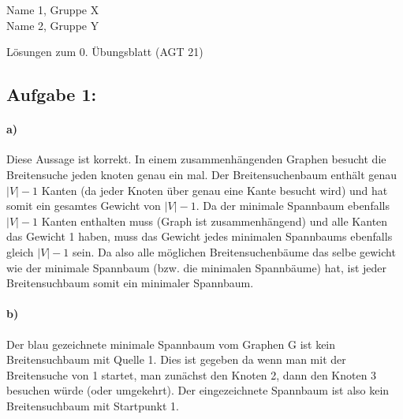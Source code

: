 \documentclass[a4paper]{article}
\begin{document}
\begin{small}
	\noindent
	Name 1, Gruppe X\\
	Name 2, Gruppe Y
\end{small}
\bigskip

\begin{center}
	\LARGE Lösungen zum 0. Übungsblatt (AGT 21)
\end{center}
\smallskip

\subsection*{Aufgabe 1:}

\paragraph{a)}
Diese Aussage ist korrekt. In einem zusammenhängenden Graphen besucht die Breitensuche
jeden knoten genau ein mal. Der Breitensuchenbaum enthält genau $|V| - 1$ Kanten (da
jeder Knoten über genau eine Kante besucht wird) und hat somit ein gesamtes Gewicht von
$|V| - 1$. Da der minimale Spannbaum ebenfalls $|V| - 1$ Kanten enthalten muss (Graph ist
zusammenhängend) und alle Kanten das Gewicht 1 haben, muss das Gewicht jedes minimalen 
Spannbaums ebenfalls gleich $|V| - 1$ sein. Da also alle möglichen Breitensuchenbäume
das selbe gewicht wie der minimale Spannbaum (bzw. die minimalen Spannbäume) hat, ist 
jeder Breitensuchbaum somit ein minimaler Spannbaum.
\paragraph{b)}
Der blau gezeichnete minimale Spannbaum vom Graphen G ist kein Breitensuchbaum mit Quelle 1.
Dies ist gegeben da wenn man mit der Breitensuche von 1 startet, man zunächst den Knoten 2, 
dann den Knoten 3 besuchen würde (oder umgekehrt). Der eingezeichnete Spannbaum ist also 
kein Breitensuchbaum mit Startpunkt 1.
\end{document}
